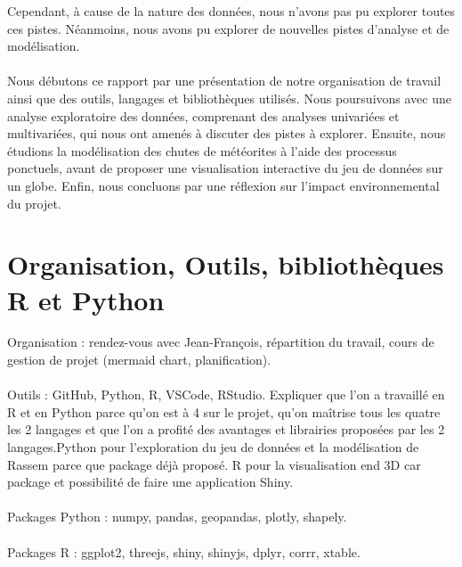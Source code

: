 \documentclass[12pt]{article}
\begin{document}
Cependant, à cause de la nature des données, nous n'avons pas pu explorer toutes ces pistes. Néanmoins, nous avons pu explorer de nouvelles pistes d'analyse et de modélisation.\\
\\
Nous débutons ce rapport par une présentation de notre organisation de travail ainsi que des outils, langages et bibliothèques utilisés. Nous poursuivons avec une analyse exploratoire des données, comprenant des analyses univariées et multivariées, qui nous ont amenés à discuter des pistes à explorer. Ensuite, nous étudions la modélisation des chutes de météorites à l'aide des processus ponctuels, avant de proposer une visualisation interactive du jeu de données sur un globe. Enfin, nous concluons par une réflexion sur l'impact environnemental du projet.\\
\newpage
\section{Organisation, Outils, bibliothèques R et Python}
Organisation : rendez-vous avec Jean-François, répartition du travail, cours de gestion de projet (mermaid chart, planification).\\
\\
Outils : GitHub, Python, R, VSCode, RStudio. Expliquer que l'on a travaillé en R et en Python parce qu'on est à 4 sur le projet, qu'on maîtrise tous les quatre les 2 langages et que l'on a profité des avantages et librairies proposées par les 2 langages.Python pour l'exploration du jeu de données et la modélisation de Rassem parce que package déjà proposé. R pour la visualisation end 3D car package et possibilité de faire une application Shiny.\\
\\
Packages Python : numpy, pandas, geopandas, plotly, shapely.\\
\\
Packages R : ggplot2, threejs, shiny, shinyjs, dplyr, corrr, xtable.\\ 
\\
\end{document}
